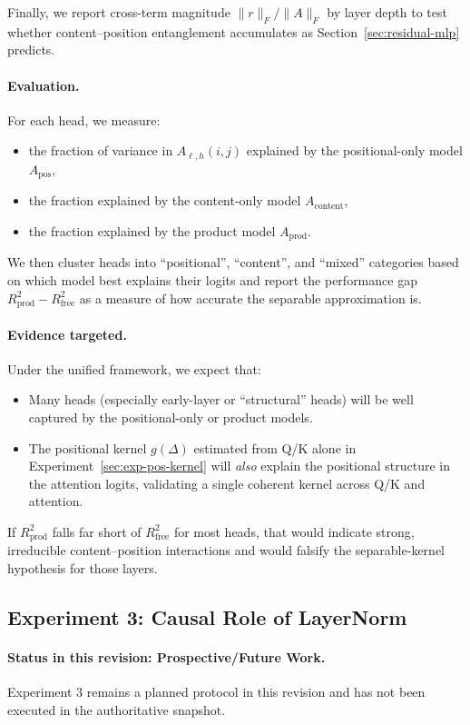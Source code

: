 \documentclass[11pt]{article}
\theoremstyle{definition}
\begin{document}
Finally, we report cross-term magnitude $\|r\|_F / \|A\|_F$ by layer depth to test whether content--position entanglement accumulates as Section~\ref{sec:residual-mlp} predicts.

\paragraph{Evaluation.}
For each head, we measure:
\begin{itemize}
    \item the fraction of variance in \(A_{\ell,h}(i,j)\) explained by the positional-only model \(A_{\text{pos}}\),
    \item the fraction explained by the content-only model \(A_{\text{content}}\),
    \item the fraction explained by the product model \(A_{\text{prod}}\).
\end{itemize}
We then cluster heads into ``positional'', ``content'', and ``mixed'' categories based on which model best explains their logits and report the performance gap \(R^2_{\text{prod}} - R^2_{\text{free}}\) as a measure of how accurate the separable approximation is.

\paragraph{Evidence targeted.}
Under the unified framework, we expect that:
\begin{itemize}
    \item Many heads (especially early-layer or ``structural'' heads) will be well captured by the positional-only or product models.
    \item The positional kernel \(g(\Delta)\) estimated from Q/K alone in Experiment~\ref{sec:exp-pos-kernel} will \emph{also} explain the positional structure in the attention logits, validating a single coherent kernel across Q/K and attention.
\end{itemize}
If \(R^2_{\text{prod}}\) falls far short of \(R^2_{\text{free}}\) for most heads, that would indicate strong, irreducible content--position interactions and would falsify the separable-kernel hypothesis for those layers.

\subsection{Experiment 3: Causal Role of LayerNorm}
\label{sec:exp-ln-ablation}

\paragraph{Status in this revision: \textbf{Prospective/Future Work}.}
Experiment 3 remains a planned protocol in this revision and has not been executed in the authoritative snapshot.
\end{document}
